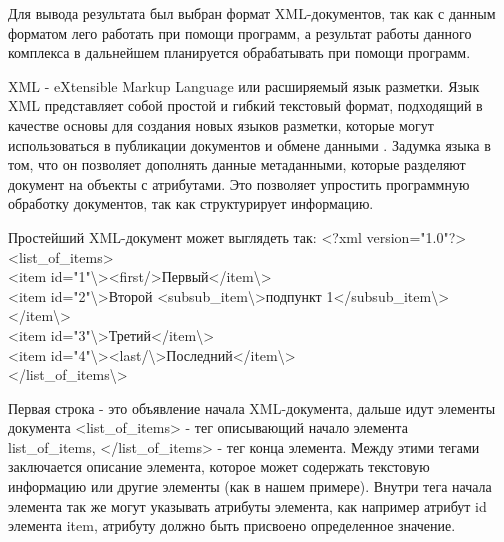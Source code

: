 Для вывода результата был выбран формат XML-документов, так как с данным форматом лего работать при помощи программ, а результат работы данного комплекса в дальнейшем планируется обрабатывать при помощи программ.

XML - eXtensible Markup Language или расширяемый язык разметки. Язык XML представляет собой простой и гибкий текстовый формат, подходящий в качестве основы для создания новых языков разметки, которые могут использоваться в публикации документов и обмене данными \cite{xml}. Задумка языка в том, что он позволяет дополнять данные метаданными, которые разделяют документ на объекты с атрибутами. Это позволяет упростить программную обработку документов, так как структурирует информацию.

Простейший XML-документ может выглядеть так:
\noindent <?xml version="1.0"?> \\
<list\_of\_items> \\
<item id="1"\textbackslash><first/>Первый</item\textbackslash> \\
<item id="2"\textbackslash>Второй <subsub\_item\textbackslash>подпункт 1</subsub\_item\textbackslash></item\textbackslash> \\
<item id="3"\textbackslash>Третий</item\textbackslash> \\
<item id="4"\textbackslash><last/\textbackslash>Последний</item\textbackslash> \\
</list\_of\_items\textbackslash>

Первая строка - это объявление начала XML-документа, дальше идут элементы документа <list\_of\_items> - тег описывающий начало элемента \\list\_of\_items, </list\_of\_items> - тег конца элемента. Между этими тегами заключается описание элемента, которое может содержать текстовую информацию или другие элементы (как в нашем примере). Внутри тега начала элемента так же могут указывать атрибуты элемента, как например атрибут id элемента item, атрибуту должно быть присвоено определенное значение.
